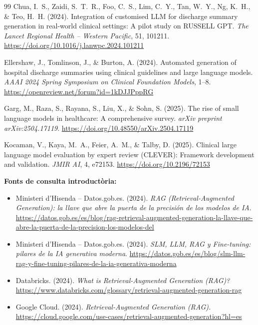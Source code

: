 \documentclass[11pt,a4paper]{article}
\begin{document}
\begin{thebibliography}{99}
Chua, I.~S., Zaidi, S.~T.~R., Foo, C.~S., Lim, C.~Y.,
Tan, W.~Y., Ng, K.~H., \& Teo, H.~H. (2024).
\newblock Integration of customised LLM for discharge summary
generation in real-world clinical settings: A pilot study
on RUSSELL GPT.
\newblock \textit{The Lancet Regional Health -- Western
Pacific}, 51, 101211.
\newblock \url{https://doi.org/10.1016/j.lanwpc.2024.101211}

Ellershaw, J., Tomlinson, J., \& Burton, A. (2024).
\newblock Automated generation of hospital discharge summaries
using clinical guidelines and large language models.
\newblock \textit{AAAI 2024 Spring Symposium on Clinical
Foundation Models}, 1--8.
\newblock \url{https://openreview.net/forum?id=1kDJJPppRG}

Garg, M., Raza, S., Rayana, S., Liu, X., \& Sohn, S. (2025).
\newblock The rise of small language models in healthcare:
A comprehensive survey.
\newblock \textit{arXiv preprint arXiv:2504.17119}.
\newblock \url{https://doi.org/10.48550/arXiv.2504.17119}

Kocaman, V., Kaya, M.~A., Feier, A.~M., \& Talby, D. (2025).
\newblock Clinical large language model evaluation by expert
review (CLEVER): Framework development and validation.
\newblock \textit{JMIR AI}, 4, e72153.
\newblock \url{https://doi.org/10.2196/72153}

\end{thebibliography}

\vspace{0.5cm}

\noindent\textbf{Fonts de consulta introductòria:}
\begin{itemize}
\item Ministeri d'Hisenda -- Datos.gob.es. (2024). \textit{RAG (Retrieval-Augmented Generation): la llave que abre la puerta de la precisión de los modelos de IA}. \url{https://datos.gob.es/es/blog/rag-retrieval-augmented-generation-la-llave-que-abre-la-puerta-de-la-precision-los-modelos-del}

\item Ministeri d'Hisenda -- Datos.gob.es. (2024). \textit{SLM, LLM, RAG y Fine-tuning: pilares de la IA generativa moderna}. \url{https://datos.gob.es/es/blog/slm-llm-rag-y-fine-tuning-pilares-de-la-ia-generativa-moderna}

\item Databricks. (2024). \textit{What is Retrieval-Augmented Generation (RAG)?} \url{https://www.databricks.com/glossary/retrieval-augmented-generation-rag}

\item Google Cloud. (2024). \textit{Retrieval-Augmented Generation (RAG).} \url{https://cloud.google.com/use-cases/retrieval-augmented-generation?hl=es}
\end{itemize}
\end{document}
